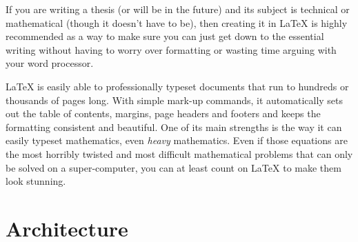 If you are writing a thesis (or will be in the future) and its subject is technical or mathematical (though it doesn't have to be), then creating it in \LaTeX{} is highly recommended as a way to make sure you can just get down to the essential writing without having to worry over formatting or wasting time arguing with your word processor.

\LaTeX{} is easily able to professionally typeset documents that run to hundreds or thousands of pages long. With simple mark-up commands, it automatically sets out the table of contents, margins, page headers and footers and keeps the formatting consistent and beautiful. One of its main strengths is the way it can easily typeset mathematics, even \emph{heavy} mathematics. Even if those equations are the most horribly twisted and most difficult mathematical problems that can only be solved on a super-computer, you can at least count on \LaTeX{} to make them look stunning.


\section{Architecture}


